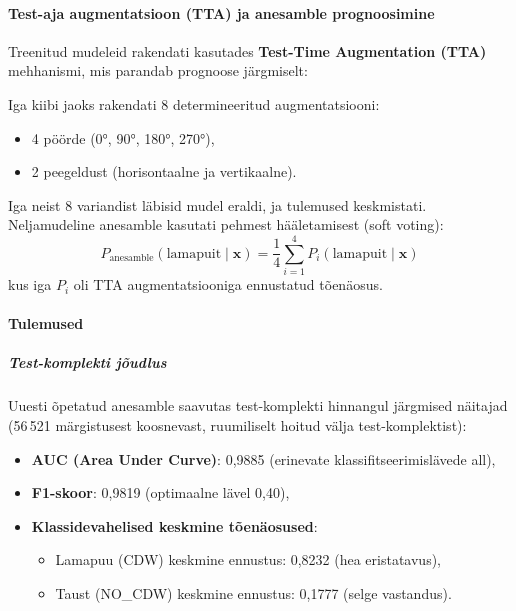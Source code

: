 \paragraph{Test-aja augmentatsioon (TTA) ja anesamble prognoosimine}

Treenitud mudeleid rakendati kasutades \textbf{Test-Time Augmentation (TTA)}
mehhanismi, mis parandab prognoose järgmiselt:

Iga kiibi jaoks rakendati 8 determineeritud augmentatsiooni:
\begin{itemize}
    \item 4 pöörde (0°, 90°, 180°, 270°),
    \item 2 peegeldust (horisontaalne ja vertikaalne).
\end{itemize}

Iga neist 8 variandist läbisid mudel eraldi, ja tulemused keskmistati.
Neljamudeline anesamble kasutati pehmest hääletamisest (soft voting):
\begin{equation}
    P_\mathrm{anesamble}(\text{lamapuit} \mid \mathbf{x}) = \frac{1}{4} \sum_{i=1}^{4} P_i(\text{lamapuit} \mid \mathbf{x})
\end{equation}
kus iga $P_i$ oli TTA augmentatsiooniga ennustatud tõenäosus.

\paragraph{Tulemused}

\subparagraph{Test-komplekti jõudlus}

Uuesti õpetatud anesamble saavutas test-komplekti hinnangul järgmised näitajad
(56\,521 märgistusest koosnevast, ruumiliselt hoitud välja test-komplektist):
\begin{itemize}
    \item \textbf{AUC (Area Under Curve)}: 0,9885 (erinevate klassifitseerimislävede all),
    \item \textbf{F1-skoor}: 0,9819 (optimaalne lävel 0,40),
    \item \textbf{Klassidevahelised keskmine tõenäosused}:
          \begin{itemize}
              \item Lamapuu (CDW) keskmine ennustus: 0,8232 (hea eristatavus),
              \item Taust (NO\_CDW) keskmine ennustus: 0,1777 (selge vastandus).
          \end{itemize}
\end{itemize}

